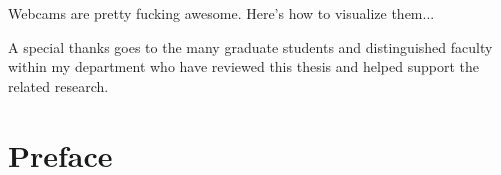 %

\begin{thesistitlepage}               %
\end{thesistitlepage}

\begin{thesisabstract}
Webcams are pretty fucking awesome.  Here's how to visualize them...
\end{thesisabstract}

\begin{thesisacknowledgments}

A special thanks goes to the many graduate students and distinguished faculty
within my department who have reviewed this thesis and helped support the
related research.
\end{thesisacknowledgments}

\begin{thesisdedicationpage}                %
\end{thesisdedicationpage}

\begin{singlespace}
\tableofcontents


\listoftables

\listoffigures
\end{singlespace}

\chapter{Preface}

